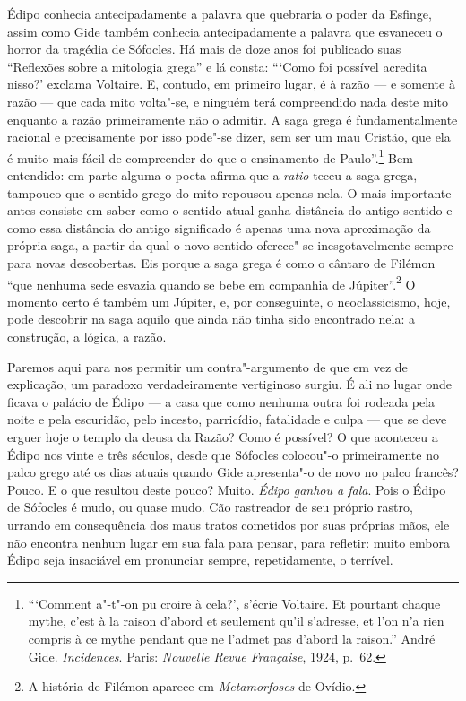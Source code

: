 Édipo conhecia antecipadamente a palavra que quebraria o poder da Esfinge,
assim como Gide também conhecia antecipadamente a palavra que
esvaneceu o horror da tragédia de Sófocles. Há mais de
doze anos foi publicado suas ``Reflexões sobre a mitologia grega'' e lá
consta: ```Como foi possível acredita nisso?' exclama Voltaire. E,
contudo, em primeiro lugar, é à razão --- e somente à razão --- que cada mito
volta"-se, e ninguém terá compreendido nada deste mito enquanto a razão primeiramente não
o admitir. A saga grega é fundamentalmente racional e precisamente por
isso pode"-se dizer, sem ser um mau Cristão, que ela é muito
mais fácil de compreender do que o ensinamento de Paulo''.\footnote{```Comment
  a"-t"-on pu croire à cela?', s'écrie Voltaire. Et pourtant chaque
  mythe, c'est à la raison d'abord et seulement qu'il s'adresse, et l'on
  n'a rien compris à ce mythe pendant que ne l'admet pas d'abord la
  raison.'' André Gide. \emph{Incidences}. Paris: \emph{Nouvelle Revue Française},
  1924, p.~62. \versal{[N.~T.]}} Bem entendido: em parte alguma o poeta afirma que a
\emph{ratio} teceu a saga grega, tampouco que o sentido grego do mito
repousou apenas nela. O mais importante antes consiste em saber como o
sentido atual ganha distância do antigo sentido e como essa distância do antigo
significado é apenas uma nova aproximação da própria saga, a partir da
qual o novo sentido oferece"-se inesgotavelmente sempre para novas
descobertas. Eis porque a saga grega é como o cântaro de Filémon ``que
nenhuma sede esvazia quando se bebe em companhia de Júpiter''.\footnote{A história de Filémon aparece em \emph{Metamorfoses} de Ovídio. \versal{[N.~O.]}} O
momento certo é também um Júpiter, e, por conseguinte, o neoclassicismo,
hoje, pode descobrir na saga aquilo que ainda não tinha sido
encontrado nela: a construção, a lógica, a razão.

Paremos aqui para nos permitir um contra"-argumento de que em vez de explicação,
um paradoxo verdadeiramente vertiginoso surgiu. É ali no lugar onde
ficava o palácio de Édipo --- a casa que como nenhuma outra foi rodeada
pela noite e pela escuridão, pelo incesto, parricídio, fatalidade e
culpa --- que se deve erguer hoje o templo da deusa da Razão? Como é
possível? O que aconteceu a Édipo nos vinte e três séculos, desde que
Sófocles colocou"-o primeiramente no palco grego até os dias atuais
quando Gide apresenta"-o de novo no palco francês? Pouco. E o que
resultou deste pouco? Muito. \emph{Édipo ganhou a fala}. Pois o Édipo de
Sófocles é mudo, ou quase mudo. Cão rastreador de seu próprio rastro,
urrando em consequência dos maus tratos cometidos por suas próprias
mãos, ele não encontra nenhum lugar em sua fala para pensar, para refletir: muito
embora Édipo seja insaciável em pronunciar sempre, repetidamente, o
terrível.

